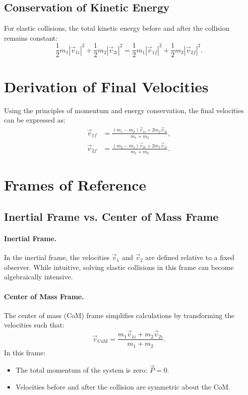 \documentclass[12pt]{article}
\begin{document}
\subsection{Conservation of Kinetic Energy}
For elastic collisions, the total kinetic energy before and after the collision remains constant:
\begin{equation}
    \frac{1}{2} m_1 |\vec{v}_{1i}|^2 + \frac{1}{2} m_2 |\vec{v}_{2i}|^2 = \frac{1}{2} m_1 |\vec{v}_{1f}|^2 + \frac{1}{2} m_2 |\vec{v}_{2f}|^2.
\end{equation}

\section{Derivation of Final Velocities}
Using the principles of momentum and energy conservation, the final velocities can be expressed as:
\begin{align}
    \vec{v}_{1f} &= \frac{(m_1 - m_2) \vec{v}_{1i} + 2 m_2 \vec{v}_{2i}}{m_1 + m_2}, \\
    \vec{v}_{2f} &= \frac{(m_2 - m_1) \vec{v}_{2i} + 2 m_1 \vec{v}_{1i}}{m_1 + m_2}.
\end{align}

\section{Frames of Reference}

\subsection{Inertial Frame vs. Center of Mass Frame}

\paragraph{Inertial Frame.} In the inertial frame, the velocities $\vec{v}_{1}$ and $\vec{v}_{2}$ are defined relative to a fixed observer. While intuitive, solving elastic collisions in this frame can become algebraically intensive.

\paragraph{Center of Mass Frame.} The center of mass (CoM) frame simplifies calculations by transforming the velocities such that:
\begin{equation}
    \vec{v}_{\text{CoM}} = \frac{m_1 \vec{v}_{1i} + m_2 \vec{v}_{2i}}{m_1 + m_2}.
\end{equation}
In this frame:
\begin{itemize}
    \item The total momentum of the system is zero: $\vec{P} = 0$.
    \item Velocities before and after the collision are symmetric about the CoM.
\end{itemize}
\end{document}
